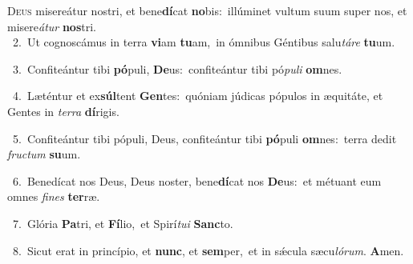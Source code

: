 \lettrine{\initial\textcolor{\initialcolor}{D}}{eus} misereátur nostri, et bene\-\textbf{dí}\-cat \textbf{no}\-bis:~\star illúminet vultum suum super nos, et misere\-\textit{á}\-\textit{tur} \textbf{nos}\-tri.\\
{\numbfont\textcolor{\numbcolor}{~2.}}~Ut cognoscámus in terra \textbf{vi}\-am \textbf{tu}\-am,~\star in ómnibus Géntibus salu\-\textit{tá}\-\textit{re} \textbf{tu}\-um.\par
{\numbfont\textcolor{\numbcolor}{~3.}}~Confiteántur tibi \textbf{pó}\-puli, \textbf{De}\-us:~\star confiteántur tibi pó\-\textit{pu}\-\textit{li} \textbf{om}\-nes.\par
{\numbfont\textcolor{\numbcolor}{~4.}}~Læténtur et ex\-\textbf{súl}\-tent \textbf{Gen}\-tes:~\star quóniam júdicas pópulos in æquitáte, et Gentes in \textit{ter}\-\textit{ra} \textbf{dí}\-rigis.\par
{\numbfont\textcolor{\numbcolor}{~5.}}~Confiteántur tibi pópuli, Deus, confiteántur tibi \textbf{pó}\-puli \textbf{om}\-nes:~\star terra dedit \textit{fruc}\-\textit{tum} \textbf{su}\-um.\par
{\numbfont\textcolor{\numbcolor}{~6.}}~Benedícat nos Deus, Deus noster, bene\-\textbf{dí}\-cat nos \textbf{De}\-us:~\star et métuant eum omnes \textit{fi}\-\textit{nes} \textbf{ter}\-ræ.\par
{\numbfont\textcolor{\numbcolor}{~7.}}~Glória \textbf{Pa}\-tri, et \textbf{Fí}\-lio,~\star et Spirí\-\textit{tu}\-\textit{i} \textbf{Sanc}\-to.\par
{\numbfont\textcolor{\numbcolor}{~8.}}~Sicut erat in princípio, et \textbf{nunc}\-, et \textbf{sem}\-per,~\star et in sǽcula sæcu\-\textit{ló}\-\textit{rum}. \textbf{A}\-men.\par
